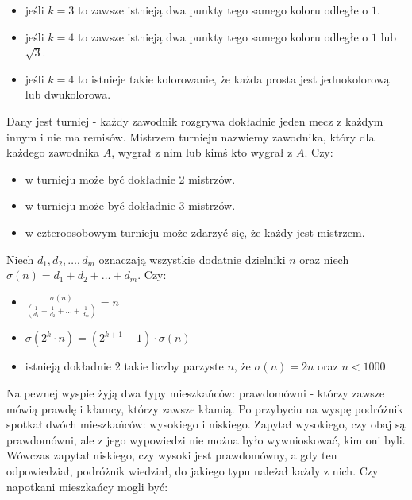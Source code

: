 \documentclass[12pt, a4paper]{article}
\newcommand{\question}[1]{\normalitem \begin{samepage}#1 \end{samepage}}
\newcommand{\questionwithasterix}[1]{ \asterixitem \begin{samepage}#1 \vspace{6cm}\end{samepage}}
\begin{document}
\begin{enumerate}
{		\begin{itemize}
			\item jeśli $k = 3$ to zawsze istnieją dwa punkty tego samego koloru odległe o $1$.
			\item jeśli $k = 4$ to zawsze istnieją dwa punkty tego samego koloru odległe o $1$ lub $\sqrt{3}$.
			\item jeśli $k = 4$ to istnieje takie kolorowanie, że każda prosta jest
                jednokolorową lub dwukolorowa.
		\end{itemize}
	}
	
	\question{
	    Dany jest turniej - każdy zawodnik rozgrywa dokładnie jeden mecz z każdym innym
        i nie ma remisów. Mistrzem turnieju nazwiemy zawodnika, który dla każdego zawodnika $A$, wygrał z nim lub kimś kto wygrał z $A$. Czy:

		\begin{itemize}
			\item w turnieju może być dokładnie 2 mistrzów.
			\item w turnieju może być dokładnie 3 mistrzów.
			\item w czteroosobowym turnieju może zdarzyć się, że każdy jest mistrzem.
		\end{itemize}
	}
	
	\question {
		Niech $d_1, d_2, \ldots, d_m$ oznaczają wszystkie dodatnie dzielniki $n$ oraz niech \\
        $\sigma(n) = d_1 + d_2 + \ldots + d_m$. Czy:

		\begin{itemize}
			\item $\frac{\sigma(n)}{(\frac{1}{d_1} + \frac{1}{d_2} + \ldots + \frac{1}{d_m})} = n$
			\item $\sigma(2^k \cdot n) = (2^{k+1}-1) \cdot \sigma(n)$
			\item istnieją dokładnie $2$ takie liczby parzyste $n$, że $\sigma(n) = 2n$ oraz $n < 1000$
		\end{itemize}
	}
	
	\questionwithasterix {
        Na pewnej wyspie żyją dwa typy mieszkańców: prawdomówni - którzy zawsze mówią prawdę i kłamcy, którzy zawsze kłamią. Po przybyciu na wyspę podróżnik spotkał dwóch mieszkańców: wysokiego i niskiego. Zapytał wysokiego, czy obaj są prawdomówni, ale z jego wypowiedzi nie można było wywnioskować, kim oni byli. Wówczas zapytał niskiego, czy wysoki jest prawdomówny, a gdy ten odpowiedział, podróżnik wiedział, do jakiego typu należał każdy z nich. Czy napotkani mieszkańcy mogli być:
        
}
\end{enumerate}
\end{document}
